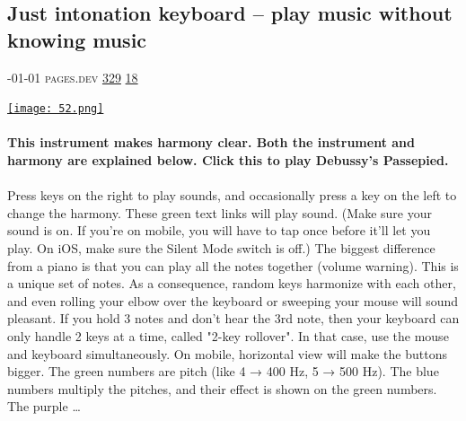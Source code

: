 \documentclass[10pt,a4paper]{article}
\begin{document}
\begin{multicols}{2}
\raggedcolumns
\noindent\begin{minipage}{\linewidth}
\medskip
\subsection{Just intonation keyboard – play music without knowing music}
\textsc{\footnotesize
{\scriptsize\faCalendar}-01-01 
{\scriptsize\faGlobe}\space 
pages.dev 
{\scriptsize\faThumbsOUp}\space 
\href{http://news.ycombinator.com/item?id=37194128\&utm\_term=comment}{329} 
{\scriptsize\faComments}\space 
\href{http://news.ycombinator.com/item?id=37194128\&utm\_term=comment}{18} 
}
\par\medskip\noindent
\href{https://ad8e.pages.dev/keyboard?utm\_source=hackernewsletter\&utm\_medium=email\&utm\_term=fun}{
    \texttt{[image: 52.png]}
}
\end{minipage}
\paragraph{}
\textbf{This instrument makes harmony clear. Both the instrument and harmony are explained below.
Click this to play Debussy's Passepied.}
\paragraph{}

Press keys on the right to play sounds, and occasionally press a key on the left to change the harmony. These green text links will play sound. (Make sure your sound is on. If you're on mobile, you will have to tap once before it'll let you play. On iOS, make sure the Silent Mode switch is off.)
The biggest difference from a piano is that you can play all the notes together (volume warning). This is a unique set of notes. As a consequence, random keys harmonize with each other, and even rolling your elbow over the keyboard or sweeping your mouse will sound pleasant. If you hold 3 notes and don't hear the 3rd note, then your keyboard can only handle 2 keys at a time, called "2-key rollover". In that case, use the mouse and keyboard simultaneously. On mobile, horizontal view will make the buttons bigger.
The green numbers are pitch (like 4 → 400 Hz, 5 → 500 Hz). The blue numbers multiply the pitches, and their effect is shown on the green numbers. The purple
\dots\par
\noindent\begin{minipage}{\linewidth}
\medskip

\end{minipage}
\end{multicols}
\end{document}
